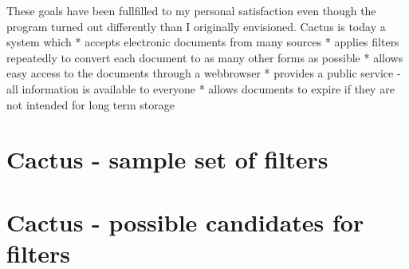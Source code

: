 These goals have been fullfilled to my personal satisfaction
even though the program turned out differently than I
originally envisioned. Cactus is today a system which *
accepts electronic documents from many sources * applies
filters repeatedly to convert each document to as many other
forms as possible * allows easy access to the documents
through a webbrowser * provides a public service - all
information is available to everyone * allows documents to
expire if they are not intended for long term storage


\chapter{Cactus - sample set of filters}
\label{cha:cactus-sample-set-of-filters}


\chapter{Cactus - possible candidates for filters}
\label{cha:cactus-possible-candidates-for-filters}








